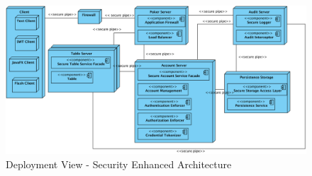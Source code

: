 \documentclass[a4paper,11pt]{report}
\begin{document}
\begin{figure}[htpb]
  \begin{center}
    \includegraphics[angle=90,scale=0.65]{deployment_secured.png}
  \end{center}
  \caption{Deployment View - Security Enhanced Architecture}\label{fig:deployment_secured}
\end{figure}
\end{document}
